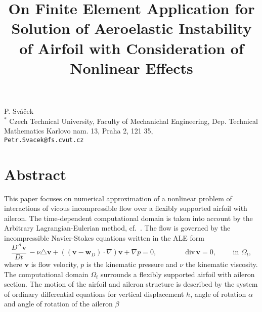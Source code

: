 


\title{On Finite Element Application for Solution of Aeroelastic Instability of Airfoil with Consideration of Nonlinear Effects}
\author{} \institute{} %
\maketitle
\begin{center}
{\large P. Sv\' a\v cek}\\
{$^\ast$ Czech Technical University, Faculty of Mechanichal Engineering,
Dep. Technical Mathematics}
Karlovo nam. 13, Praha 2, 121 35,\\{\tt Petr.Svacek@fs.cvut.cz}\\
\end{center}

\section*{Abstract}
This paper focuses on numerical approximation of a nonlinear problem
of interactions of vicous incompressible flow over a flexibly supported airfoil with aileron.
The time-dependent computational domain is taken into account by the Arbitrary Lagrangian-Eulerian method,
cf.~\cite{Sva1}. The flow is governed by the incompressible Navier-Stokes equations written in the ALE form 
\begin{equation}
\label{eq:NS}
\frac{D^{\mathcal A} {\mathbf v} }{D t} \,  
- \nu \triangle {\mathbf v} + (({\mathbf v}-{\mathbf w}_D)\cdot\nabla) {\mathbf v}
+ \nabla p = 0,  \qquad\qquad
\mbox{div}\, {\mathbf v} = 0, 
\qquad \mbox{ in } \Omega_t,
\end{equation}
where $\mathbf v$ is flow velocity, $p$ is the kinematic pressure and $\nu$ the kinematic viscosity.
The computational domain $\Omega_t$ surrounds a flexibly supported airfoil with aileron section. 
The motion of the airfoil and aileron structure is described by the system of  ordinary differential equations
for vertical displacement $h$, angle of rotation $\alpha$ and angle of rotation of the aileron $\beta$

